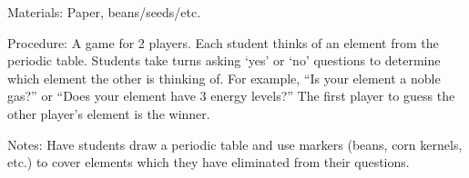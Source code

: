 \begin{multicols}{2}
\begin{description*}
\item[Materials:]{Paper, beans/seeds/etc.}
\item[Procedure:]{A game for 2 players. Each student thinks of an element from the periodic table. Students take turns asking `yes' or `no' questions to determine which element the other is thinking of. For example, ``Is your element a noble gas?'' or ``Does your element have 3 energy levels?'' The first player to guess the other player's element is the winner.}
\item[Notes:]{Have students draw a periodic table and use markers (beans, corn kernels, etc.) to cover elements which they have eliminated from their questions.}
\end{description*}



\end{multicols}

\pagebreak